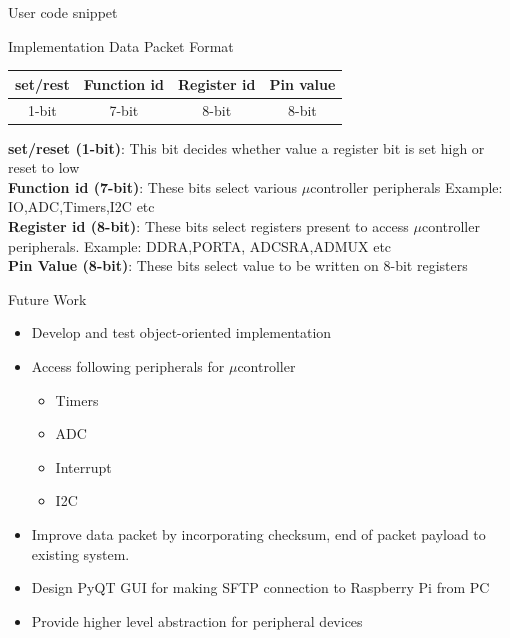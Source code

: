 \documentclass[10pt,handout,english]{beamer}
\begin{document}
\begin{frame}{User code snippet}
	
\end{frame}

\begin{frame}{Implementation}
Data Packet Format \\[4mm]
\begin{center}
\begin{tabular}{|c|c|c|c|}
\hline  set/rest & Function id & Register id  & Pin value \\ 
\hline  1-bit& 7-bit & 8-bit  & 8-bit  \\ 
\hline 
\end{tabular}
\end{center}

\vspace{3mm}

\textbf{set/reset (1-bit)}: This bit decides whether value a register bit is set high or reset to low \\[1mm]

\textbf{Function id (7-bit)}: These bits select various ${\mu}$controller peripherals Example: IO,ADC,Timers,I2C etc \\[1mm]

\textbf{Register id (8-bit)}: These bits select registers present to access ${\mu}$controller peripherals. Example: DDRA,PORTA, ADCSRA,ADMUX etc \\[1mm]

\textbf{Pin Value (8-bit)}: These bits select value to be written on 8-bit registers


\end{frame}
\begin{frame}{Future Work}
\begin{itemize}
\item Develop and test object-oriented implementation
\item Access following peripherals for ${\mu}$controller
	\begin{itemize}
	\item Timers
	\item ADC
	\item Interrupt
	\item I2C
	\end{itemize}
\item Improve data packet by incorporating checksum, end of packet payload to existing system.
\item Design PyQT GUI for making SFTP connection to Raspberry Pi from PC
\item Provide higher level abstraction for peripheral devices  
\end{itemize}

\end{frame}
\end{document}
